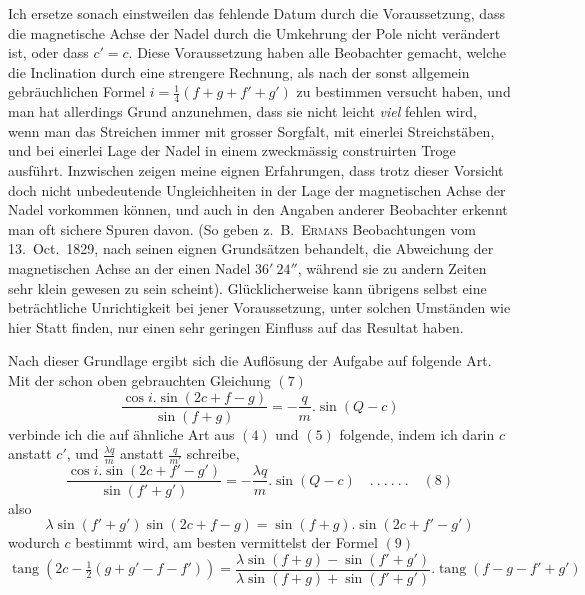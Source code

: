 Ich ersetze sonach einstweilen das fehlende Datum durch die Voraussetzung, dass die magnetische Achse der Nadel durch die Umkehrung der Pole nicht verändert ist, oder dass $c'=c$. Diese Voraussetzung haben alle Beobachter gemacht, welche die Inclination durch eine strengere Rechnung, als nach der sonst allgemein gebräuchlichen Formel $i=\frac14(f+g+f'+g')$ zu bestimmen versucht
haben, und man hat allerdings Grund anzunehmen, dass sie nicht leicht \textit{viel} fehlen wird, wenn man das Streichen immer mit grosser Sorgfalt, mit einerlei Streichstäben, und bei einerlei Lage der Nadel in einem zweckmässig construirten Troge ausführt. Inzwischen zeigen meine eignen Erfahrungen, dass trotz dieser Vorsicht doch nicht unbedeutende Ungleichheiten in der Lage der magnetischen Achse der Nadel vorkommen können, und auch in den Angaben anderer Beobachter erkennt man oft sichere Spuren davon. (So geben z.\ B.\ \textsc{Ermans} Beobachtungen vom 13.\ Oct.\ 1829, nach seinen eignen Grundsätzen behandelt, die Abweichung der magnetischen Achse an der einen Nadel $36'\ 24''$, während sie zu andern Zeiten sehr klein gewesen zu sein scheint). Glücklicherweise kann übrigens selbst eine beträchtliche Unrichtigkeit bei jener Voraussetzung, unter solchen Umständen wie hier Statt finden, nur einen sehr geringen Einfluss auf das Resultat haben.

Nach dieser Grundlage ergibt sich die Auflösung der Aufgabe auf folgende Art. Mit der schon oben gebrauchten Gleichung $(7)$
\[
\frac{\cos i.\sin(2c+f-g)}{\sin(f+g)}=-\frac{q}{m}.\sin(Q-c)
\]
verbinde ich die auf ähnliche Art aus $(4)$ und $(5)$ folgende, indem ich darin $c$ anstatt $c'$, und $\frac{\lambda q}{m}$ anstatt $\frac{q}{m'}$ schreibe,
\[
\frac{\cos i.\sin(2c+f'-g')}{\sin(f'+g')}=-\frac{\lambda q}{m}.\sin(Q-c)\quad.\ .\ .\ .\ .\ .\quad(8)
\]
also
\[
\lambda\sin(f'+g')\sin(2c+f-g)=\sin(f+g).\sin(2c+f'-g')
\]
wodurch $c$ bestimmt wird, am besten vermittelst der Formel $(9)$
\[
\operatorname{tang}(2c-\tfrac12(g+g'-f-f'))=\frac{\lambda\sin(f+g)-\sin(f'+g')}{\lambda\sin(f+g)+\sin(f'+g')}.\operatorname{tang}(f-g-f'+g')
\]

